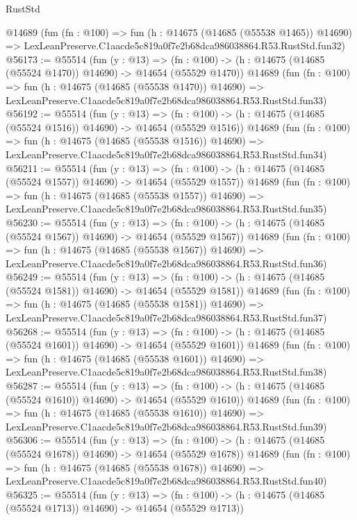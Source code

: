 \begin{lexlean}{RustStd}
\begin{coremodule}
    @14689
    (fun (fn : @100) =>
    fun (h : @14675 (@14685 (@55538 @1465)) @14690) =>
    LexLeanPreserve.C1aacde5c819a0f7e2b68dca986038864.R53.RustStd.fun32)
@56173 := @55514
    (fun (y : @13) =>
    (fn : @100) -> (h : @14675 (@14685 (@55524 @1470)) @14690) -> @14654 (@55529 @1470))
    @14689
    (fun (fn : @100) =>
    fun (h : @14675 (@14685 (@55538 @1470)) @14690) =>
    LexLeanPreserve.C1aacde5c819a0f7e2b68dca986038864.R53.RustStd.fun33)
@56192 := @55514
    (fun (y : @13) =>
    (fn : @100) -> (h : @14675 (@14685 (@55524 @1516)) @14690) -> @14654 (@55529 @1516))
    @14689
    (fun (fn : @100) =>
    fun (h : @14675 (@14685 (@55538 @1516)) @14690) =>
    LexLeanPreserve.C1aacde5c819a0f7e2b68dca986038864.R53.RustStd.fun34)
@56211 := @55514
    (fun (y : @13) =>
    (fn : @100) -> (h : @14675 (@14685 (@55524 @1557)) @14690) -> @14654 (@55529 @1557))
    @14689
    (fun (fn : @100) =>
    fun (h : @14675 (@14685 (@55538 @1557)) @14690) =>
    LexLeanPreserve.C1aacde5c819a0f7e2b68dca986038864.R53.RustStd.fun35)
@56230 := @55514
    (fun (y : @13) =>
    (fn : @100) -> (h : @14675 (@14685 (@55524 @1567)) @14690) -> @14654 (@55529 @1567))
    @14689
    (fun (fn : @100) =>
    fun (h : @14675 (@14685 (@55538 @1567)) @14690) =>
    LexLeanPreserve.C1aacde5c819a0f7e2b68dca986038864.R53.RustStd.fun36)
@56249 := @55514
    (fun (y : @13) =>
    (fn : @100) -> (h : @14675 (@14685 (@55524 @1581)) @14690) -> @14654 (@55529 @1581))
    @14689
    (fun (fn : @100) =>
    fun (h : @14675 (@14685 (@55538 @1581)) @14690) =>
    LexLeanPreserve.C1aacde5c819a0f7e2b68dca986038864.R53.RustStd.fun37)
@56268 := @55514
    (fun (y : @13) =>
    (fn : @100) -> (h : @14675 (@14685 (@55524 @1601)) @14690) -> @14654 (@55529 @1601))
    @14689
    (fun (fn : @100) =>
    fun (h : @14675 (@14685 (@55538 @1601)) @14690) =>
    LexLeanPreserve.C1aacde5c819a0f7e2b68dca986038864.R53.RustStd.fun38)
@56287 := @55514
    (fun (y : @13) =>
    (fn : @100) -> (h : @14675 (@14685 (@55524 @1610)) @14690) -> @14654 (@55529 @1610))
    @14689
    (fun (fn : @100) =>
    fun (h : @14675 (@14685 (@55538 @1610)) @14690) =>
    LexLeanPreserve.C1aacde5c819a0f7e2b68dca986038864.R53.RustStd.fun39)
@56306 := @55514
    (fun (y : @13) =>
    (fn : @100) -> (h : @14675 (@14685 (@55524 @1678)) @14690) -> @14654 (@55529 @1678))
    @14689
    (fun (fn : @100) =>
    fun (h : @14675 (@14685 (@55538 @1678)) @14690) =>
    LexLeanPreserve.C1aacde5c819a0f7e2b68dca986038864.R53.RustStd.fun40)
@56325 := @55514
    (fun (y : @13) =>
    (fn : @100) -> (h : @14675 (@14685 (@55524 @1713)) @14690) -> @14654 (@55529 @1713))

\end{coremodule}
\end{lexlean}
